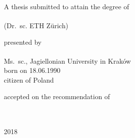 
\begin{titlepage}

\begin{addmargin}[-1cm]{-3cm}
\begin{center}
\large

\hfill
\vfill


\vfill

\begingroup
\color{Maroon}
\\
\\
 \\
\bigskip %
\endgroup

\vfill

A thesis submitted to attain the degree of \\
\bigskip
{} \\
\smallskip
{\small (Dr.\ sc. ETH Zürich)}

\vfill

presented by \\
\bigskip
\spacedallcaps{\myName} \\
\bigskip
Ms.\ sc., Jagiellonian University in Kraków \\
\medskip
born on 18.06.1990 \\
\medskip
citizen of Poland

\vfill

accepted on the recommendation of \\
\bigskip
{} \\
 \\

\vfill

2018

\vfill

\end{center}
\end{addmargin}

\end{titlepage}
